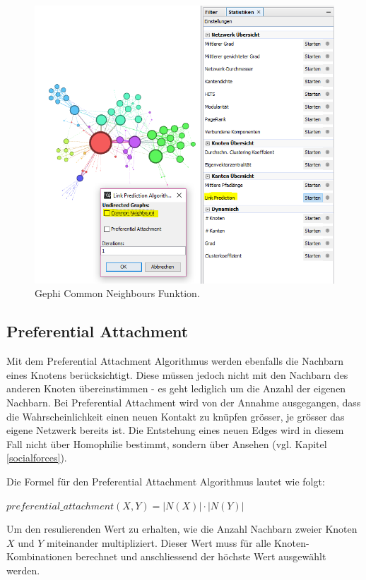 \begin{figure}[htbp]
    \includegraphics[width=\linewidth]{resources/gephi-CN.png}
    \caption{Gephi Common Neighbours Funktion.}
    \label{fig:screen8}
\end{figure}

\subsection{Preferential Attachment}
Mit dem Preferential Attachment Algorithmus werden ebenfalls die Nachbarn eines Knotens berücksichtigt. Diese müssen jedoch nicht
mit den Nachbarn des anderen Knoten übereinstimmen - es geht lediglich um die Anzahl der eigenen Nachbarn. Bei Preferential Attachment
wird von der Annahme ausgegangen, dass die Wahrscheinlichkeit einen neuen Kontakt zu knüpfen grösser, je grösser das eigene Netzwerk bereits ist.
Die Entstehung eines neuen Edges wird in diesem Fall nicht über Homophilie bestimmt, sondern über Ansehen (vgl. Kapitel \ref{socialforces}).

Die Formel für den Preferential Attachment Algorithmus lautet wie folgt:

$preferential\_attachment(X,Y) = | N(X) | \cdot | N(Y ) |$

Um den resulierenden Wert zu erhalten, wie die Anzahl Nachbarn zweier Knoten $X$ und $Y$ miteinander multipliziert. Dieser Wert muss für alle Knoten-Kombinationen berechnet und anschliessend der höchste Wert
ausgewählt werden.

